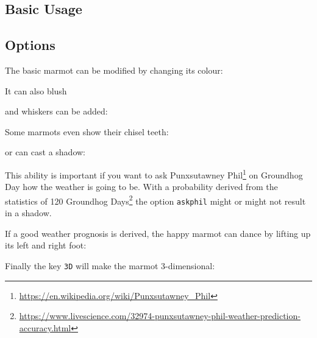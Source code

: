 \documentclass[parskip=half]{scrartcl}
\begin{document}
\subsection{Basic Usage}

\begin{tcblisting}{}
\marmot
\end{tcblisting}

\subsection{Options}

The basic marmot can be modified by changing its colour:
\begin{tcblisting}{}
\marmot[body=blue]
\end{tcblisting}

It can also blush
\begin{tcblisting}{}
\marmot[blush]
\end{tcblisting}

and whiskers can be added:
\begin{tcblisting}{}
\marmot[whiskers=gray]
\end{tcblisting}

Some marmots even show their chisel teeth:
\begin{tcblisting}{}
\marmot[teeth=white]
\end{tcblisting}

or can cast a shadow:
\begin{tcblisting}{}
\marmot[shadow]
\end{tcblisting}

This ability is important if you want to ask Punxsutawney Phil\footnote{\url{https://en.wikipedia.org/wiki/Punxsutawney_Phil}} on Groundhog Day how the weather is going to be. With a probability derived from the statistics of 120 Groundhog Days\footnote{\url{https://www.livescience.com/32974-punxsutawney-phil-weather-prediction-accuracy.html}} the option \lstinline|askphil| might or might not result in a shadow.
\begin{tcblisting}{}
\marmot[askphil]
\end{tcblisting}

If a good weather prognosis is derived, the happy marmot can dance by lifting up its left and right foot: 
\begin{tcblisting}{}
\marmot[leftstep]
\marmot[rightstep,xshift=2cm]
\end{tcblisting}

Finally the key \lstinline|3D| will make the marmot 3-dimensional:
\begin{tcblisting}{}
\marmot[3D]
\end{tcblisting}
\end{document}
